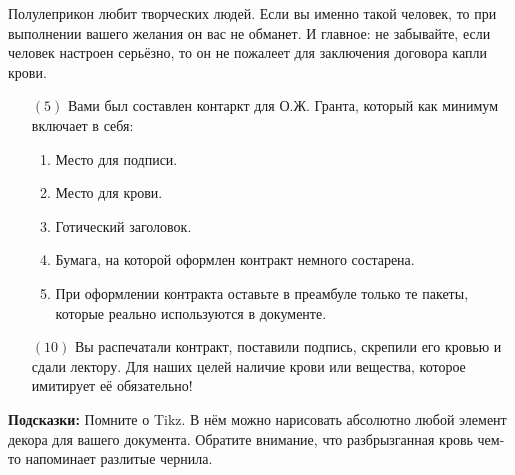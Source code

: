 \documentclass[12pt, a4paper, oneside]{article}
\begin{document}
Полулеприкон любит творческих людей. Если вы именно такой человек, то при выполнении вашего желания он вас не обманет. И главное: не забывайте, если человек настроен серьёзно, то он не пожалеет для заключения договора капли крови.

\begin{itemize}
\item[$(5)$]   Вами был составлен контаркт для О.Ж. Гранта, который как минимум включает в себя:

\begin{enumerate}
\item  Место для подписи.
\item  Место для крови.
\item  Готический заголовок.
\item  Бумага, на которой оформлен контракт немного состарена.
\item  При оформлении контракта оставьте в преамбуле только те пакеты, которые реально используются в документе.
\end{enumerate}

\item[$(10)$] Вы распечатали контракт, поставили подпись, скрепили его кровью и сдали лектору. Для наших целей наличие крови или вещества, которое имитирует её обязательно!
\end{itemize}

\textbf{Подсказки:}  Помните о Tikz. В нём можно нарисовать абсолютно любой элемент декора для вашего документа. Обратите внимание, что разбрызганная кровь чем-то напоминает разлитые чернила.
\end{document}
